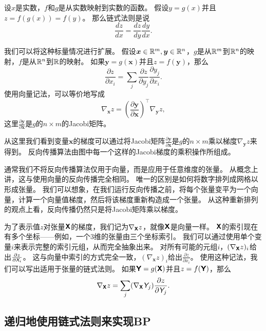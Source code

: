 设$x$是实数，$f$和$g$是从实数映射到实数的函数。
假设$y=g(x)$并且$z=f(g(x))=f(y)$。
那么链式法则是说
\begin{equation}
\frac{dz}{dx}=\frac{dz}{dy} \frac{dy}{dx}.
\label{eq:6.44}
\end{equation}

我们可以将这种标量情况进行扩展。
假设$\bm{x}\in \mathbb{R}^m, \bm{y}\in \mathbb{R}^n$，$g$是从$\mathbb{R}^m$到$\mathbb{R}^n$的映射，$f$是从$\mathbb{R}^n$到$\mathbb{R}$的映射。
如果$\bm{y}=g(\bm{x})$并且$z=f(\bm{y})$，那么
\begin{equation}
\frac{\partial z}{\partial x_i} = \sum_j \frac{\partial z}{\partial y_j} \frac{\partial y_j}{\partial x_i}.
\end{equation}
使用向量记法，可以等价地写成
\begin{equation}
\nabla_{\bm{x}}z = \left ( \frac{\partial \bm{y}}{\partial \bm{x}} \right )^\top \nabla_{\bm{y}} z,
\end{equation}
这里$\frac{\partial \bm{y}}{\partial \bm{x}}$是$g$的$n\times m$的Jacobi矩阵。

从这里我们看到变量$\bm{x}$的梯度可以通过将Jacobi矩阵$\frac{\partial \bm{y}}{\partial \bm{x}}$是$g$的$n\times m$乘以梯度$\nabla_{\bm{y}} z$来得到。
反向传播算法由图中每一个这样的Jacobi梯度的乘积操作所组成。


通常我们不将反向传播算法仅用于向量，而是应用于任意维度的张量。
从概念上讲，这与使用向量的反向传播完全相同。 
唯一的区别是如何将数字排列成网格以形成张量。 
我们可以想象，在我们运行反向传播之前，将每个张量变平为一个向量，计算一个向量值梯度，然后将该梯度重新构造成一个张量。
从这种重新排列的观点上看，反向传播仍然只是将Jacobi矩阵乘以梯度。


为了表示值$z$对张量$\textsf{\textbf{X}}$的梯度，我们记为$\nabla_{\textsf{\textbf{X}}} z$，就像$\textsf{\textbf{X}}$是向量一样。
$\textsf{\textbf{X}}$的索引现在有多个坐标——例如，一个3维的张量由三个坐标索引。
我们可以通过使用单个变量$i$来表示完整的索引元组，从而完全抽象出来。
对所有可能的元组$i$，$(\nabla_{\textsf{\textbf{X}}} z)_i$给出$\frac{\partial z}{\partial \textit{\textsf{X}}_i}$。
这与向量中索引的方式完全一致，$(\nabla_{\bm{x}} z)_i$给出$\frac{\partial z}{\partial x_i}$。
使用这种记法，我们可以写出适用于张量的链式法则。
如果$\textsf{\textbf{Y}}=g(\textsf{\textbf{X}})$并且$z=f(\textsf{\textbf{Y}})$，那么
\begin{equation}
  \nabla_{\textsf{\textbf{X}}} z = \sum_j (\nabla_{\textsf{\textbf{X}}} \textit{\textsf{Y}}_j)\frac{\partial z}{\partial \textit{\textsf{Y}}_j}.
  \label{eq:6.47}
\end{equation}

\subsection{递归地使用链式法则来实现BP}
\label{sec:recursively_applying_the_chain_rule_to_obtain_backprop}

